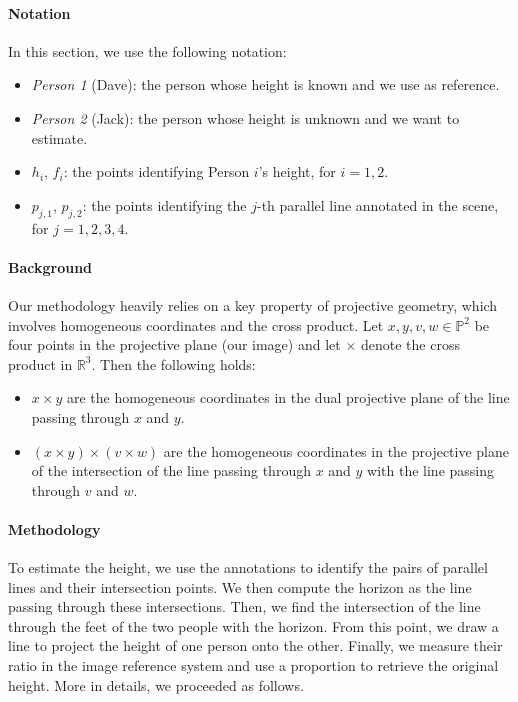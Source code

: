 \paragraph{Notation} In this section, we use the following notation:

\begin{itemize}
    \item \textit{Person 1} (Dave): the person whose height is known and we use as reference.
    \item \textit{Person 2} (Jack): the person whose height is unknown and we want to estimate.
    \item $h_i$, $f_i$: the points identifying Person $i$'s height, for $i=1,2$.
    \item $p_{j,1}$, $p_{j,2}$: the points identifying the $j$-th parallel line annotated in the scene, for $j=1,2,3,4$.
\end{itemize}

\paragraph{Background} Our methodology heavily relies on a key property of projective geometry, which involves homogeneous coordinates and the cross product. Let $x,y,v,w \in\mathbb{P}^2$ be four points in the projective plane (our image) and let $\times$ denote the cross product in $\mathbb{R}^3$. Then the following holds:

\begin{itemize}
    \item $x \times y$ are the homogeneous coordinates in the dual projective plane of the line passing through $x$ and $y$. 
    \item $(x \times y) \times (v \times w)$ are the homogeneous coordinates in the projective plane of the intersection of the line passing through $x$ and $y$ with the line passing through $v$ and $w$.
\end{itemize}

\paragraph{Methodology} To estimate the height, we use the annotations to identify the pairs of parallel lines and their intersection points. We then compute the horizon as the line passing through these intersections. Then, we find the intersection of the line through the feet of the two people with the horizon. From this point, we draw a line to project the height of one person onto the other. Finally, we measure their ratio in the image reference system and use a proportion to retrieve the original height. More in details, we proceeded as follows.

